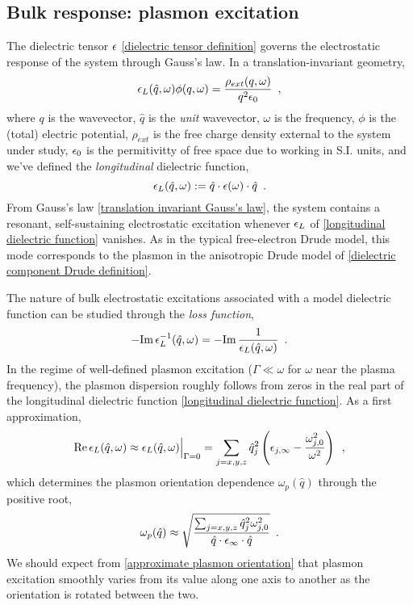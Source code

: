 \subsection{Bulk response: plasmon excitation}

The dielectric tensor $\epsilon$ \eqref{dielectric tensor definition} governs the electrostatic response of the system through Gauss's law.  In a translation-invariant geometry,
\begin{equation}
    \label{translation invariant Gauss's law}
    \epsilon_L(\hat q,\omega) \phi(q,\omega) = \frac{\rho_{ext}(q,\omega)}{q^2 \epsilon_0}\,\,\,,
\end{equation}
where $q$ is the wavevector, $\hat q$ is the {\it unit} wavevector, $\omega$ is the frequency, $\phi$ is the (total) electric potential, $\rho_{ext}$ is the free charge density external to the system under study, $\epsilon_0$ is the permitivitty of free space due to working in S.I. units, and we've defined the {\it longitudinal} dielectric function,
\begin{equation}
    \label{longitudinal dielectric function}
    \epsilon_L(\hat q,\omega) := \hat q\cdot \epsilon(\omega)\cdot \hat q\,\,\,.
\end{equation}
From Gauss's law \eqref{translation invariant Gauss's law}, the system contains a resonant, self-sustaining electrostatic excitation whenever $\epsilon_L$ of \eqref{longitudinal dielectric function} vanishes.  As in the typical free-electron Drude model, this mode corresponds to the plasmon in the anisotropic Drude model of \eqref{dielectric component Drude definition}.

The nature of bulk electrostatic excitations associated with a model dielectric function can be studied through the {\it loss function},
\begin{equation}
    \label{bulk loss function}
    -\text{Im}\, \epsilon^{-1}_L(\hat q,\omega) = -\text{Im}\,\frac{1}{\epsilon_L(\hat q,\omega)}
    \,\,\,.
\end{equation}
In the regime of well-defined plasmon excitation ($\Gamma \ll \omega$ for $\omega$ near the plasma frequency), the plasmon dispersion roughly follows from zeros in the real part of the longitudinal dielectric function \eqref{longitudinal dielectric function}.  As a first approximation,
\begin{equation}
    \label{real part of longitudinal dielectric function without damping}
    \text{Re}\,\epsilon_L(\hat q, \omega) \approx \epsilon_L(\hat q, \omega)\Big|_{\Gamma = 0}
    =
    \sum_{j=x,y,z} \hat q_j^2\left(\epsilon_{j,\infty} - \frac{\omega_{j,0}^2}{\omega^2}\right)
    \,\,\,,
\end{equation}
which determines the plasmon orientation dependence $\omega_p(\hat q)$ through the positive root,
\begin{equation}
    \label{approximate plasmon orientation}
    \omega_p(\hat q) \approx 
    \sqrt{\frac{\sum_{j=x,y,z} \hat q_j^2 \omega_{j,0}^2}{\hat q \cdot \epsilon_{\infty} \cdot \hat q}}
    \,\,\,.
\end{equation}
We should expect from \eqref{approximate plasmon orientation} that plasmon excitation smoothly varies from its value along one axis to another as the orientation is rotated between the two.

